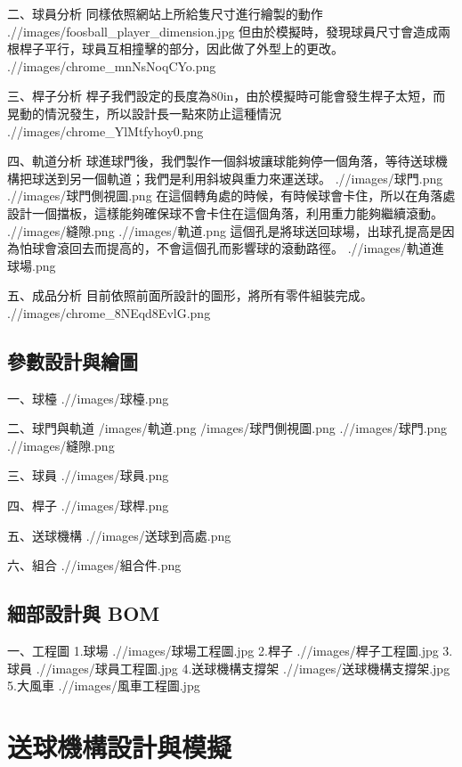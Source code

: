 \documentclass[12pt,,]{report}
\begin{document}
二、球員分析 同樣依照網站上所給隻尺寸進行繪製的動作
.//images/foosball\_player\_dimension.jpg
但由於模擬時，發現球員尺寸會造成兩根桿子平行，球員互相撞擊的部分，因此做了外型上的更改。
.//images/chrome\_mnNsNoqCYo.png

三、桿子分析
桿子我們設定的長度為80in，由於模擬時可能會發生桿子太短，而晃動的情況發生，所以設計長一點來防止這種情況
.//images/chrome\_YlMtfyhoy0.png

四、軌道分析
球進球門後，我們製作一個斜坡讓球能夠停一個角落，等待送球機構把球送到另一個軌道；我們是利用斜坡與重力來運送球。
.//images/球門.png .//images/球門側視圖.png
在這個轉角處的時候，有時候球會卡住，所以在角落處設計一個擋板，這樣能夠確保球不會卡住在這個角落，利用重力能夠繼續滾動。
.//images/縫隙.png .//images/軌道.png
這個孔是將球送回球場，出球孔提高是因為怕球會滾回去而提高的，不會這個孔而影響球的滾動路徑。
.//images/軌道進球場.png

五、成品分析 目前依照前面所設計的圖形，將所有零件組裝完成。
.//images/chrome\_8NEqd8EvlG.png

\hypertarget{ux53c3ux6578ux8a2dux8a08ux8207ux7e6aux5716}{%
\section{參數設計與繪圖}\label{ux53c3ux6578ux8a2dux8a08ux8207ux7e6aux5716}}

一、球檯 .//images/球檯.png

二、球門與軌道 /images/軌道.png /images/球門側視圖.png
.//images/球門.png .//images/縫隙.png

三、球員 .//images/球員.png

四、桿子 .//images/球桿.png

五、送球機構 .//images/送球到高處.png

六、組合 .//images/組合件.png

\hypertarget{ux7d30ux90e8ux8a2dux8a08ux8207-bom}{%
\section{細部設計與 BOM}\label{ux7d30ux90e8ux8a2dux8a08ux8207-bom}}

一、工程圖 1.球場 .//images/球場工程圖.jpg 2.桿子
.//images/桿子工程圖.jpg 3.球員 .//images/球員工程圖.jpg
4.送球機構支撐架 .//images/送球機構支撐架.jpg 5.大風車
.//images/風車工程圖.jpg

\hypertarget{ux9001ux7403ux6a5fux69cbux8a2dux8a08ux8207ux6a21ux64ec}{%
\chapter{送球機構設計與模擬}\label{ux9001ux7403ux6a5fux69cbux8a2dux8a08ux8207ux6a21ux64ec}}
\end{document}
